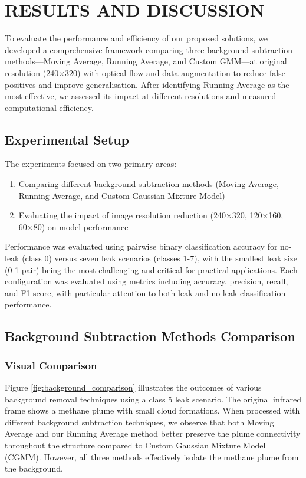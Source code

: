 \chapter{RESULTS AND DISCUSSION}

To evaluate the performance and efficiency of our proposed solutions, we developed a comprehensive framework comparing three background subtraction methods—Moving Average, Running Average, and Custom GMM—at original resolution (240×320) with optical flow and data augmentation to reduce false positives and improve generalisation. After identifying Running Average as the most effective, we assessed its impact at different resolutions and measured computational efficiency.

\section{Experimental Setup}

The experiments focused on two primary areas:
\begin{enumerate}
\item Comparing different background subtraction methods (Moving Average, Running Average, and Custom Gaussian Mixture Model)
\item Evaluating the impact of image resolution reduction (240×320, 120×160, 60×80) on model performance
\end{enumerate}

Performance was evaluated using pairwise binary classification accuracy for no-leak (class 0) versus seven leak scenarios (classes 1-7), with the smallest leak size (0-1 pair) being the most challenging and critical for practical applications. Each configuration was evaluated using metrics including accuracy, precision, recall, and F1-score, with particular attention to both leak and no-leak classification performance.

\section{Background Subtraction Methods Comparison}

\subsection{Visual Comparison}

Figure \ref{fig:background_comparison} illustrates the outcomes of various background removal techniques using a class 5 leak scenario. The original infrared frame shows a methane plume with small cloud formations. When processed with different background subtraction techniques, we observe that both Moving Average and our Running Average method better preserve the plume connectivity throughout the structure compared to Custom Gaussian Mixture Model (CGMM). However, all three methods effectively isolate the methane plume from the background.

